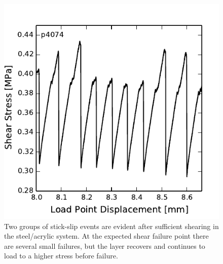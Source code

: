 \begin{figure}
\begin{center}
\includegraphics{chap_granular_stiffness/Fig11.pdf}
\caption{\label{fig:double_ss}
Two groups of stick-slip events are evident after sufficient shearing in the steel/acrylic system.  At the expected shear failure point there are several small failures, but the layer recovers and continues to load to a higher stress before failure.}
\end{center}
\end{figure}




